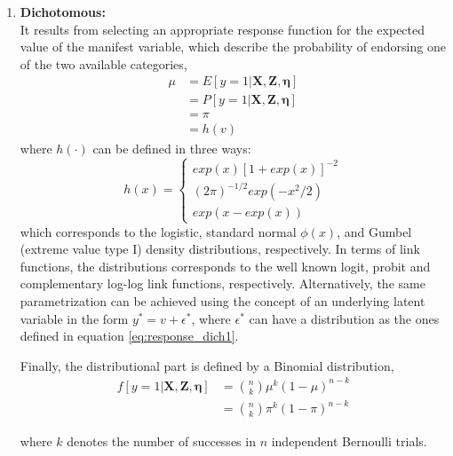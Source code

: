 \begin{enumerate}
	\item \textbf{Dichotomous:} \\
	It results from selecting an appropriate response function for the expected value of the manifest variable, which describe the probability of endorsing one of the two available categories,
	\begin{equation} \label{eq:link_dich}
		\begin{split}
		\mu &= E[y=1 | \mathbf{X}, \mathbf{Z}, \pmb{\eta}] \\ 
		&= P[y=1 | \mathbf{X}, \mathbf{Z}, \pmb{\eta}] \\
		&= \pi \\
		&= h(v)
		\end{split}	
	\end{equation}
	where $h(\cdot)$ can be defined in three ways:	
	\begin{equation} \label{eq:response_dich1}
		h(x) = 
		\begin{cases}
		exp(x)[1 + exp(x)]^{-2} \\
		(2 \pi )^{-1/2} exp(-x^{2}/2) \\
		exp(x - exp(x))
		\end{cases}
	\end{equation}
	which corresponds to the logistic, standard normal $\phi(x)$, and Gumbel (extreme value type I) density  distributions, respectively. In terms of link functions, the distributions corresponds to the well known logit, probit and complementary log-log link functions, respectively. Alternatively, the same parametrization can be achieved using the concept of an underlying latent variable in the form $y^{*} = v + \epsilon^{*}$, where $\epsilon^{*}$ can have a distribution as the ones defined in equation \ref{eq:response_dich1}.
	
	Finally, the distributional part is defined by a Binomial distribution,
	\begin{equation} \label{eq:dist_dich}
		\begin{split}
		f[y=1 | \mathbf{X}, \mathbf{Z}, \pmb{\eta}] &= \binom{n}{k} \mu^{k} (1-\mu)^{n-k} \\
		&= \binom{n}{k} \pi^{k} (1-\pi)^{n-k}
		\end{split}
	\end{equation}

	where $k$ denotes the number of successes in $n$ independent Bernoulli trials.
	
	
			

\end{enumerate}
